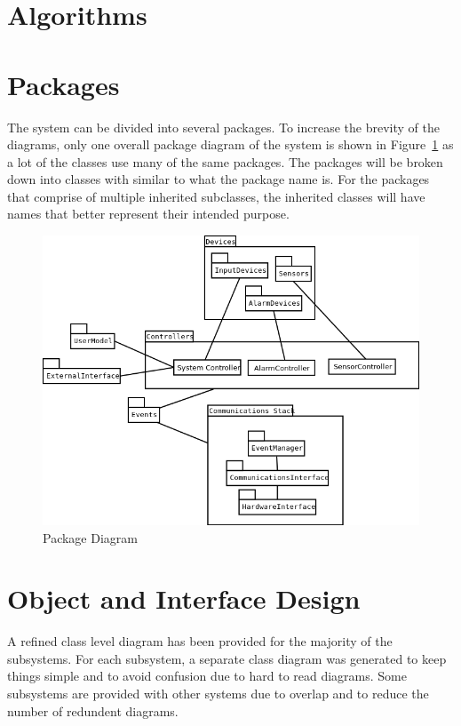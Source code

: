 \documentclass{report}
\begin{document}
\section{Algorithms}

\section{Packages}
The system can be divided into several packages. To increase the brevity of the
diagrams, only one overall package diagram of the system is shown in
Figure~\ref{fig:package_diagram} as a lot of the classes use many of the same
packages. The packages will be broken down into classes with similar to what
the package name is. For the packages that comprise of multiple inherited
subclasses, the inherited classes will have names that better represent their
intended purpose.

\begin{figure}
    \caption{Package Diagram}
    \label{fig:package_diagram}
    \includegraphics[scale=0.5]{package_diagram.png}
\end{figure}

\section{Object and Interface Design}
A refined class level diagram has been provided for the majority of the
subsystems. For each subsystem, a separate class diagram was generated to keep
things simple and to avoid confusion due to hard to read diagrams. Some
subsystems are provided with other systems due to overlap and to reduce the
number of redundent diagrams.
\end{document}
